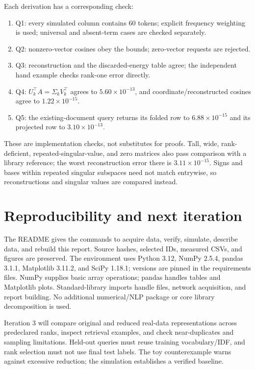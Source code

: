 \documentclass[11pt]{article}
\begin{document}
Each derivation has a corresponding check:
\begin{enumerate}
\item Q1: every simulated column contains 60 tokens; explicit frequency weighting
is used; universal and absent-term cases are checked separately.
\item Q2: nonzero-vector cosines obey the bounds; zero-vector requests are rejected.
\item Q3: reconstruction and the discarded-energy table agree; the independent
hand example checks rank-one error directly.
\item Q4: $U_k^\top A=\Sigma_kV_k^\top$ agrees to $5.60\times10^{-13}$, and
coordinate/reconstructed cosines agree to $1.22\times10^{-15}$.
\item Q5: the existing-document query returns its folded row to
$6.88\times10^{-15}$ and its projected row to $3.10\times10^{-13}$.
\end{enumerate}
These are implementation checks, not substitutes for proofs. Tall, wide,
rank-deficient, repeated-singular-value, and zero matrices also pass comparison
with a library reference; the worst reconstruction error there is
$3.11\times10^{-15}$. Signs and bases within repeated singular subspaces need
not match entrywise, so reconstructions and singular values are compared instead.

\section{Reproducibility and next iteration}
The README gives the commands to acquire data, verify, simulate, describe data,
and rebuild this report. Source hashes, selected IDs, measured CSVs, and figures
are preserved. The environment uses Python 3.12, NumPy 2.5.4, pandas 3.1.1,
Matplotlib 3.11.2, and SciPy 1.18.1; versions are pinned in the requirements files.
NumPy supplies basic array operations; pandas handles tables and Matplotlib plots.
Standard-library imports handle files, network acquisition, and report building.
No additional numerical/NLP package or core library decomposition is used.

Iteration 3 will compare original and reduced real-data representations across
predeclared ranks, inspect retrieval examples, and check near-duplicates and
sampling limitations. Held-out queries must reuse training vocabulary/IDF, and
rank selection must not use final test labels. The toy counterexample warns
against excessive reduction; the simulation establishes a verified baseline.
\end{document}
